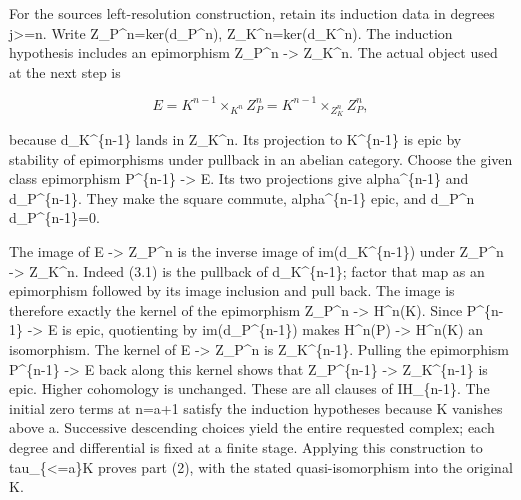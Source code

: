 \documentclass[11pt]{article}
\begin{document}
For the source\textquotesingle s left-resolution construction,\allowbreak{} retain its induction data in degrees j>\allowbreak{}=n. Write Z\_\allowbreak{}P\textasciicircum{}n\allowbreak{}=ker(d\_\allowbreak{}P\textasciicircum{}n)\allowbreak{},\allowbreak{} Z\_\allowbreak{}K\textasciicircum{}n\allowbreak{}=ker(d\_\allowbreak{}K\textasciicircum{}n)\allowbreak{}. The induction hypothesis includes an epimorphism Z\_\allowbreak{}P\textasciicircum{}n \allowbreak{}-> Z\_\allowbreak{}K\textasciicircum{}n. The actual object used at the next step is

\[
 E=K^{n-1}\mathbin{\times}_{K^n}Z_P^n
  =K^{n-1}\mathbin{\times}_{Z_K^n}Z_P^n,                 \tag{3.1}
\]

because d\_\allowbreak{}K\textasciicircum{}\{n-1\} lands in Z\_\allowbreak{}K\textasciicircum{}n. Its projection to K\^{}\{n-1\} is epic by stability of epimorphisms under pullback in an abelian category. Choose the given class epimorphism P\^{}\{n-1\} \allowbreak{}-> E. Its two projections give alpha\^{}\{n-1\} and d\_\allowbreak{}P\textasciicircum{}\{n-1\}. They make the square commute,\allowbreak{} alpha\^{}\{n-1\} epic,\allowbreak{} and d\_\allowbreak{}P\textasciicircum{}n d\_\allowbreak{}P\textasciicircum{}\{n-1\}\allowbreak{}=0.

The image of E \allowbreak{}-> Z\_\allowbreak{}P\textasciicircum{}n is the inverse image of im(d\_\allowbreak{}K\textasciicircum{}\{n-1\})\allowbreak{} under Z\_\allowbreak{}P\textasciicircum{}n \allowbreak{}-> Z\_\allowbreak{}K\textasciicircum{}n. Indeed (3.1)\allowbreak{} is the pullback of d\_\allowbreak{}K\textasciicircum{}\{n-1\}; factor that map as an epimorphism followed by its image inclusion and pull back. The image is therefore exactly the kernel of the epimorphism Z\_\allowbreak{}P\textasciicircum{}n \allowbreak{}-> H\textasciicircum{}n(K)\allowbreak{}. Since P\^{}\{n-1\} \allowbreak{}-> E is epic,\allowbreak{} quotienting by im(d\_\allowbreak{}P\textasciicircum{}\{n-1\})\allowbreak{} makes H\textasciicircum{}n(P)\allowbreak{} \allowbreak{}-> H\textasciicircum{}n(K)\allowbreak{} an isomorphism. The kernel of E \allowbreak{}-> Z\_\allowbreak{}P\textasciicircum{}n is Z\_\allowbreak{}K\textasciicircum{}\{n-1\}. Pulling the epimorphism P\^{}\{n-1\} \allowbreak{}-> E back along this kernel shows that Z\_\allowbreak{}P\textasciicircum{}\{n-1\} \allowbreak{}-> Z\_\allowbreak{}K\textasciicircum{}\{n-1\} is epic. Higher cohomology is unchanged. These are all clauses of IH\_\allowbreak{}\{n-1\}. The initial zero terms at n\allowbreak{}=a\allowbreak{}+1 satisfy the induction hypotheses because K vanishes above a. Successive descending choices yield the entire requested complex; each degree and differential is fixed at a finite stage. Applying this construction to tau\_\allowbreak{}\{<\allowbreak{}=a\}K proves part (2)\allowbreak{},\allowbreak{} with the stated quasi-isomorphism into the original K.
\end{document}
